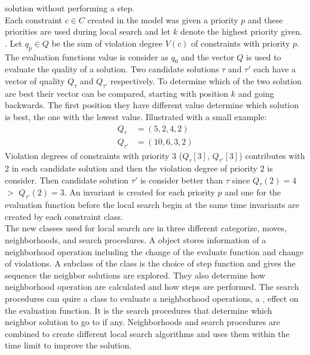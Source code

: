 solution without performing a step. \\ 
Each constraint $c \in C$ created in the model was given a priority $p$ and these priorities are used during local 
search and let $k$ denote the highest priority given. . Let $q_p \in Q$ be the sum of violation degree $V(c)$ of constraints with priority $p$. The evaluation functions 
value is consider as $q_0$ and the vector $Q$ is used to evaluate the quality of a solution. Two candidate solutions 
$\tau$ and $\tau'$ each have a vector of quality $Q_\tau$ and $Q_{\tau'}$ respectively. To determine which of the two 
solution are best their vector can be compared, starting with position $k$ and going backwards. The first position they 
have different value determine which solution is best, the one with the lowest value. Illustrated with a small example: 
\\ 
\begin{align}
 Q_\tau &= (5,2,4,2) \\ 
 Q_{\tau'} &=(10,6,3,2) 
\end{align}
Violation degrees of constraints with priority 3 ($Q_\tau[3]$, $Q_{\tau'}[3]$) contributes with 2 in each candidate 
solution and then the violation degree of priority 2 is consider. Then candidate solution $\tau'$ is consider better 
than $\tau$ since $Q_\tau(2) = 4$ $>$ $Q_{\tau'}(2) = 3$. An invariant is created for each priority $p$ and one for the 
evaluation function before the local search begin at the same time invariants are created by each constraint class. \\
The new classes used for local search are in three different categorize, moves, neighborhoods, and search 
procedures. A  object stores information of a neighborhood operation including the change of the evaluate 
function and change of violations. A subclass of the  class is the choice of step function and 
gives the sequence the neighbor solutions are explored. They also determine how neighborhood operation are calculated 
and how steps are performed. The search procedures can quire a  class to evaluate a 
neighborhood operations, a , effect on the evaluation function. It is the search procedures that determine 
which neighbor solution to go to if any. Neighborhoods and search procedures are combined to create different local 
search algorithms and  uses them within the time limit to improve the solution. \\ 
